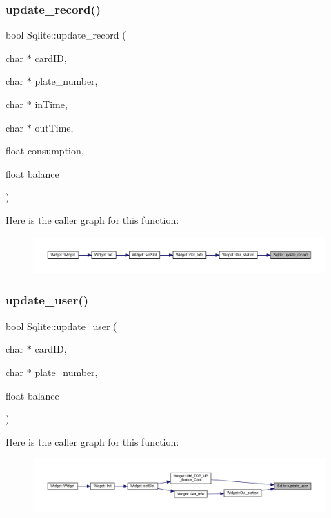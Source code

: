 \subsubsection{\texorpdfstring{update\_record()}{update\_record()}}
{\footnotesize\ttfamily bool Sqlite\+::update\+\_\+record (\begin{DoxyParamCaption}\item[{char $\ast$}]{card\+ID,  }\item[{char $\ast$}]{plate\+\_\+number,  }\item[{char $\ast$}]{in\+Time,  }\item[{char $\ast$}]{out\+Time,  }\item[{float}]{consumption,  }\item[{float}]{balance }\end{DoxyParamCaption})}

Here is the caller graph for this function\+:
\nopagebreak
\begin{figure}[H]
\begin{center}
\leavevmode
\includegraphics[width=350pt]{class_sqlite_a4120092c96b9000b83a299d60635f2a3_icgraph}
\end{center}
\end{figure}
\mbox{\label{class_sqlite_ae7d3c48b92d42ea9f55b9e8880a8052a}} 
\subsubsection{\texorpdfstring{update\_user()}{update\_user()}}
{\footnotesize\ttfamily bool Sqlite\+::update\+\_\+user (\begin{DoxyParamCaption}\item[{char $\ast$}]{card\+ID,  }\item[{char $\ast$}]{plate\+\_\+number,  }\item[{float}]{balance }\end{DoxyParamCaption})}

Here is the caller graph for this function\+:
\nopagebreak
\begin{figure}[H]
\begin{center}
\leavevmode
\includegraphics[width=350pt]{class_sqlite_ae7d3c48b92d42ea9f55b9e8880a8052a_icgraph}
\end{center}
\end{figure}


